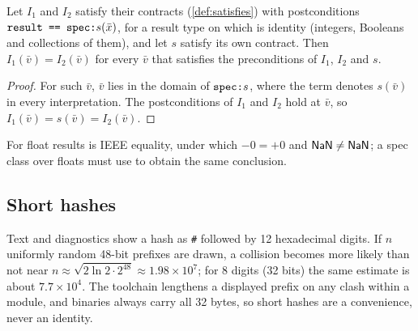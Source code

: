 \begin{proposition}\label{prop:specclass}
Let $I_1$ and $I_2$ satisfy their contracts (\cref{def:satisfies}) with postconditions
$\texttt{result == spec:}s(\bar x)$, for a result type on which \kw{==} is identity (integers,
Booleans and collections of them), and let $s$ satisfy its own contract. Then $I_1(\bar v)=
I_2(\bar v)$ for every $\bar v$ that satisfies the preconditions of $I_1$, $I_2$ and $s$.
\end{proposition}
\begin{proof}
For such $\bar v$, $\bar v$ lies in the domain of $\texttt{spec:}s$, where the term denotes
$s(\bar v)$ in every interpretation. The postconditions of $I_1$ and $I_2$ hold at $\bar v$, so
$I_1(\bar v)=s(\bar v)=I_2(\bar v)$.
\end{proof}

For float results \kw{==} is IEEE equality, under which $-0=+0$ and $\mathsf{NaN}\neq\mathsf{NaN}$; a spec class
over floats must use  to obtain the same conclusion.

\subsection{Short hashes}

Text and diagnostics show a hash as \texttt{\#} followed by 12 hexadecimal digits. If $n$
uniformly random 48-bit prefixes are drawn, a collision becomes more likely than not near
$n\approx\sqrt{2\ln 2\cdot 2^{48}}\approx 1.98\times10^{7}$; for 8 digits (32 bits) the same
estimate is about $7.7\times10^{4}$. The toolchain lengthens a displayed prefix on any clash
within a module, and binaries always carry all 32 bytes, so short hashes are a convenience,
never an identity.
